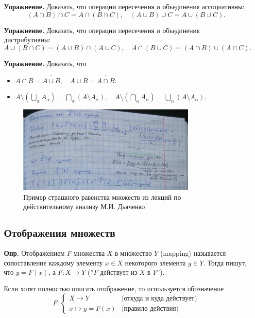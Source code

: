 \documentclass[a4paper,12pt]{article}
\newcommand{\braces}[1]{\left(#1\right)}
\newcounter{z-counter}
\newcounter{th-counter}
\newcounter{df-counter}
\newcommand{\df}{\par\noindent\textbf{Опр.} }
\begin{document}
\noindent\textbf{Упражнение.} Доказать, что операции пересечения и объединения ассоциативны:
\[ (A \cap B) \cap C = A \cap (B \cap C), \quad (A \cup B) \cup C = A \cup (B \cup C). \]

\noindent\textbf{Упражнение.} Доказать, что операции пересечения и объединения дистрибутивны:
\[ A \cup (B \cap C) = (A \cup B) \cap (A \cup C), \quad A \cap (B \cup C) = (A \cap B) \cup (A \cap C). \]

\noindent\textbf{Упражнение.} Доказать, что
\begin{itemize}
    \item $A \cap B = \overline{\overline{A} \cup \overline{B}}, \quad A \cup B = \overline{\overline{A} \cap \overline{B}}$;
    \item $A \setminus \braces{\bigcup_\alpha A_\alpha} = \bigcap_\alpha (A \setminus A_\alpha), \quad A \setminus \braces{\bigcap_\alpha A_\alpha} = \bigcup_\alpha (A \setminus A_\alpha)$.
\end{itemize}

\begin{figure}[h!]  %
\centering
\includegraphics[width=0.8\textwidth]{sets_from_real_calculus.jpg} %
\caption{Пример страшного равенства множеств из лекций по действительному анализу М.И. Дьяченко}
\label{fig:mylabel}
\end{figure}

\subsection*{Отображения множеств}
\df Отображением $F$ множества $X$ в множество $Y$  (mapping) называется сопоставление каждому элементу $x \in X$ некоторого элемента $y \in Y$. Тогда пишут, что $y = F(x)$, а $F : X \rightarrow Y$ (''$F$ действует из $X$ в $Y$''). 

Если хотят полностью описать отображение, то используется обозначение
$$F : \begin{cases}
X \rightarrow Y & \text{(откуда и куда действует)}\\
x \mapsto y = F(x) & \text{(правило действия)}
\end{cases}$$
\end{document}
